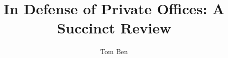 \documentclass[12pt, a4paper]{article}
\renewcommand{\%}{\textit{\origpercent}}
\begin{document}
\title{\bfseries In Defense of Private Offices: A Succinct Review}
\author{Tom Ben}
\maketitle



\printbibliography[heading=bibintoc]
\end{document}
